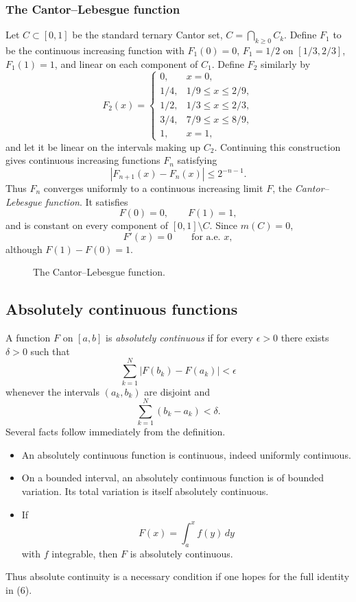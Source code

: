 \documentclass[11pt,openany]{book}
\begin{document}
\subsubsection*{The Cantor--Lebesgue function}

Let $C\subset[0,1]$ be the standard ternary Cantor set, $C=\bigcap_{k\ge0}C_k$. Define $F_1$ to be the continuous increasing function with $F_1(0)=0$, $F_1=1/2$ on $[1/3,2/3]$, $F_1(1)=1$, and linear on each component of $C_1$. Define $F_2$ similarly by
\[
F_2(x)=
\begin{cases}
0,&x=0,\\
1/4,&1/9\le x\le2/9,\\
1/2,&1/3\le x\le2/3,\\
3/4,&7/9\le x\le8/9,\\
1,&x=1,
\end{cases}
\]
and let it be linear on the intervals making up $C_2$. Continuing this construction gives continuous increasing functions $F_n$ satisfying
\[
|F_{n+1}(x)-F_n(x)|\le2^{-n-1}.
\]
Thus $F_n$ converges uniformly to a continuous increasing limit $F$, the \emph{Cantor--Lebesgue function}. It satisfies
\[
F(0)=0,\qquad F(1)=1,
\]
and is constant on every component of $[0,1]\setminus C$. Since $m(C)=0$,
\[
F'(x)=0\qquad\text{for a.e. }x,
\]
although $F(1)-F(0)=1$.

\begin{figure}[ht]
\centering
{}
\caption{The Cantor--Lebesgue function.}
\end{figure}

\subsection{Absolutely continuous functions}

A function $F$ on $[a,b]$ is \emph{absolutely continuous} if for every $\epsilon>0$ there exists $\delta>0$ such that
\[
\sum_{k=1}^N|F(b_k)-F(a_k)|<\epsilon
\]
whenever the intervals $(a_k,b_k)$ are disjoint and
\[
\sum_{k=1}^N(b_k-a_k)<\delta.
\]
Several facts follow immediately from the definition.
\begin{itemize}
\item An absolutely continuous function is continuous, indeed uniformly continuous.
\item On a bounded interval, an absolutely continuous function is of bounded variation. Its total variation is itself absolutely continuous.
\item If
\[
F(x)=\int_a^x f(y)\,dy
\]
with $f$ integrable, then $F$ is absolutely continuous.
\end{itemize}
Thus absolute continuity is a necessary condition if one hopes for the full identity in (6).
\end{document}
